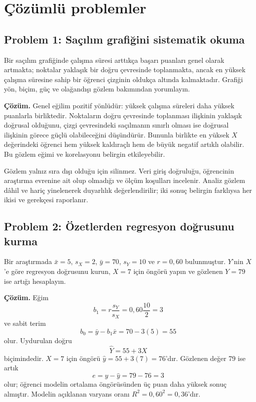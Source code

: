 \section{Çözümlü problemler}

\subsection*{Problem 1: Saçılım grafiğini sistematik okuma}

Bir saçılım grafiğinde çalışma süresi arttıkça başarı puanları genel olarak
artmakta; noktalar yaklaşık bir doğru çevresinde toplanmakta, ancak en yüksek
çalışma süresine sahip bir öğrenci çizginin oldukça altında kalmaktadır.
Grafiği yön, biçim, güç ve olağandışı gözlem bakımından yorumlayın.

\textbf{Çözüm.} Genel eğilim pozitif yönlüdür: yüksek çalışma süreleri daha
yüksek puanlarla birliktedir. Noktaların doğru çevresinde toplanması ilişkinin
yaklaşık doğrusal olduğunu, çizgi çevresindeki saçılmanın sınırlı olması ise
doğrusal ilişkinin görece güçlü olabileceğini düşündürür. Bununla birlikte en
yüksek $X$ değerindeki öğrenci hem yüksek kaldıraçlı hem de büyük negatif
artıklı olabilir. Bu gözlem eğimi ve korelasyonu belirgin etkileyebilir.

Gözlem yalnız sıra dışı olduğu için silinmez. Veri giriş doğruluğu, öğrencinin
araştırma evrenine ait olup olmadığı ve ölçüm koşulları incelenir. Analiz
gözlem dâhil ve hariç yinelenerek duyarlılık değerlendirilir; iki sonuç
belirgin farklıysa her ikisi ve gerekçesi raporlanır.

\subsection*{Problem 2: Özetlerden regresyon doğrusunu kurma}

Bir araştırmada $\bar x=5$, $s_X=2$, $\bar y=70$, $s_Y=10$ ve $r=0{,}60$
bulunmuştur. $Y$'nin $X$'e göre regresyon doğrusunu kurun, $X=7$ için öngörü
yapın ve gözlenen $Y=79$ ise artığı hesaplayın.

\textbf{Çözüm.} Eğim
\[
b_1=r\frac{s_Y}{s_X}=0{,}60\frac{10}{2}=3
\]
ve sabit terim
\[
b_0=\bar y-b_1\bar x=70-3(5)=55
\]
olur. Uydurulan doğru
\[
\hat Y=55+3X
\]
biçimindedir. $X=7$ için öngörü $\hat y=55+3(7)=76$'dır. Gözlenen değer 79
ise artık
\[
e=y-\hat y=79-76=3
\]
olur; öğrenci modelin ortalama öngörüsünden üç puan daha yüksek sonuç
almıştır. Modelin açıklanan varyans oranı $R^2=0{,}60^2=0{,}36$'dır.

